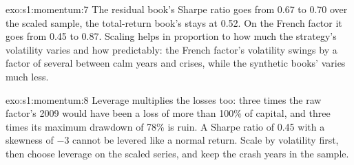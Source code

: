 \begin{solution}{exo:s1:momentum:7}
The residual book's Sharpe ratio goes from 0.67 to 0.70 over the scaled sample, the total-return book's stays at 0.52. On the French factor it goes from 0.45
to 0.87. Scaling helps in proportion to how much the strategy's volatility varies and how predictably: the French factor's volatility swings by a factor of
several between calm years and crises, while the synthetic books' varies much less.
\end{solution}

\begin{solution}{exo:s1:momentum:8}
Leverage multiplies the losses too: three times the raw factor's 2009 would have been a loss of more than 100\% of capital, and three times its maximum
drawdown of 78\% is ruin. A Sharpe ratio of 0.45 with a skewness of $-3$ cannot be levered like a normal return. Scale by volatility first, then choose
leverage on the scaled series, and keep the crash years in the sample.
\end{solution}


